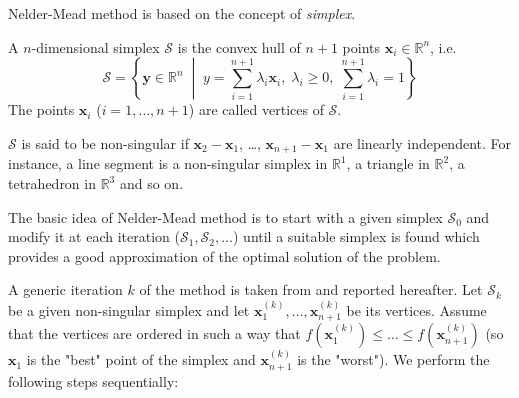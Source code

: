 Nelder-Mead method is based on the concept of \textit{simplex}.
\begin{definition}[Simplex]
A $n$-dimensional simplex $\mathcal{S}$ is the convex hull of $n+1$ points $\mathbf{x}_i \in \mathbb{R}^n$, i.e.
\[
\mathcal{S} = \left\{\mathbf{y}\in\mathbb{R}^n \; \middle| \; y=\sum_{i=1}^{n+1} \lambda_i \mathbf{x}_i, \; \lambda_i \geq 0, \; \sum_{i=1}^{n+1}\lambda_i = 1\right\}
\]
The points $\mathbf{x}_i$ ($i=1,\dots,n+1$) are called vertices of $\mathcal{S}$.
\end{definition}
$\mathcal{S}$ is said to be non-singular if $\mathbf{x}_2 - \mathbf{x}_1$, \dots, $\mathbf{x}_{n+1} - \mathbf{x}_1$ are linearly independent. For instance, a line segment is a non-singular simplex in $\mathbb{R}^1$, a triangle in $\mathbb{R}^2$, a tetrahedron in $\mathbb{R}^3$ and so on.

The basic idea of Nelder-Mead method is to start with a given simplex $\mathcal{S}_0$ and modify it at each iteration ($\mathcal{S}_1, \mathcal{S}_2, \dots$) until a suitable simplex is found which provides a good approximation of the optimal solution of the problem.

A generic iteration $k$ of the method is taken from \cite{nelder_mead_implementation} and reported hereafter. Let $\mathcal{S}_k$ be a given non-singular simplex and let $\mathbf{x}_1^{(k)}, \dots, \mathbf{x}_{n+1}^{(k)}$ be its vertices. Assume that the vertices are ordered in such a way that $f(\mathbf{x}_1^{(k)}) \leq \dots \leq f(\mathbf{x}_{n+1}^{(k)})$ (so $\mathbf{x}_1$ is the "best" point of the simplex and $\mathbf{x}_{n+1}^{(k)}$ is the "worst"). We perform the following steps sequentially:

